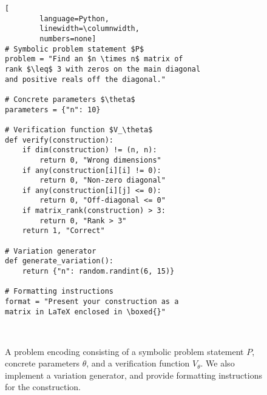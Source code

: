 \lstset{%
        framexleftmargin=10pt,
        framexrightmargin=5pt,
        framextopmargin=6pt,
        framexbottommargin=6pt,  
        frame=tb, framerule=0pt,
}

\begin{figure}[t]
    \centering

    \begin{lstlisting}[
        language=Python, 
        linewidth=\columnwidth, 
        numbers=none]
# Symbolic problem statement $P$
problem = "Find an $n \times n$ matrix of 
rank $\leq$ 3 with zeros on the main diagonal 
and positive reals off the diagonal."

# Concrete parameters $\theta$
parameters = {"n": 10}

# Verification function $V_\theta$
def verify(construction):
    if dim(construction) != (n, n):
        return 0, "Wrong dimensions"
    if any(construction[i][i] != 0):
        return 0, "Non-zero diagonal"
    if any(construction[i][j] <= 0):
        return 0, "Off-diagonal <= 0"
    if matrix_rank(construction) > 3:
        return 0, "Rank > 3"
    return 1, "Correct"

# Variation generator
def generate_variation():
    return {"n": random.randint(6, 15)}

# Formatting instructions
format = "Present your construction as a 
matrix in LaTeX enclosed in \boxed{}"



\end{lstlisting}

\caption{A problem encoding consisting of a symbolic problem statement $P$, concrete parameters $\theta$, and a verification function $V_\theta$. 
We also implement a variation generator, and provide formatting instructions for the construction.}
\label{fig:problem_encoding}
\end{figure}
